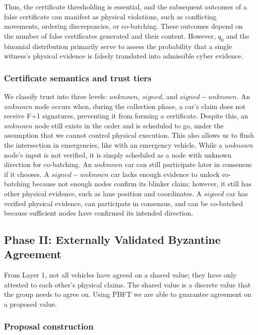 \documentclass[letterpaper,10pt,conference]{IEEEtran}
\begin{document}
Thus, the certificate thresholding is essential, and the subsequent outcomes of a false certificate can manifest as physical violations, such as conflicting movements, ordering discrepancies, or co-batching. These outcomes depend on the number of false certificates generated and their content. However, \(q_0\) and the binomial distribution primarily serve to assess the probability that a single witness's physical evidence is falsely translated into admissible cyber evidence.

\subsubsection{Certificate semantics and trust tiers}

We classify trust into three levels: $unknown$, $signed$, and $signed-unknown$. An $unknown$ node occurs when, during the collection phase, a car's claim does not receive F+1 signatures, preventing it from forming a certificate. Despite this, an $unknown$ node still exists in the order and is scheduled to go, under the assumption that we cannot control physical execution. This also allows us to flush the intersection in emergencies, like with an emergency vehicle. While a $unknown$ node's input is not verified, it is simply scheduled as a node with unknown direction for co-batching. An $unknown$ car can still participate later in consensus if it chooses. A $signed-unknown$ car lacks enough evidence to unlock co-batching because not enough nodes confirm its blinker claim; however, it still has other physical evidence, such as lane position and coordinates. A $signed$ car has verified physical evidence, can participate in consensus, and can be co-batched because sufficient nodes have confirmed its intended direction.



\subsection{Phase II: Externally Validated Byzantine Agreement}
\label{sec:phase2}

From Layer 1, not all vehicles have agreed on a shared value; they have only attested to each other's physical claims. The shared value is a discrete value that the group needs to agree on. Using PBFT we are able to guarantee agreement on a proposed value. 

\subsubsection{Proposal construction}
\end{document}
